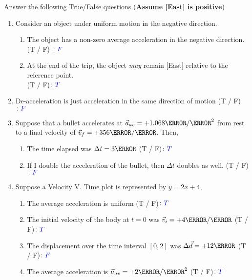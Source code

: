 \documentclass[12pt]{article} %
\begin{document}
\begin{qstn}[1] %
    Answer the following True/False questions (\textbf{Assume [East] is positive})
    \begin{enumerate}
        \item Consider an object under uniform motion in the negative direction.
            \begin{enumerate}[label = (\alph*)]
                \item The object has a non-zero average acceleration in the negative direction. (T / F) $\colon \textcolor{blue}{F}$
                \item At the end of the trip, the object \emph{may} remain [East] relative to the reference point. \\(T / F)$\colon \textcolor{blue}{T}$
            \end{enumerate}
        \item De-acceleration is just acceleration in the same direction of motion (T / F) $\colon \textcolor{blue}{F}$
        \item Suppose that a bullet accelerates at $\vec a_{av} = +1.068 \km / \s^2$ from rest to a final velocity of $\vec v_f = +356 \m / \s$. Then,
            \begin{enumerate}[label = (\alph*)]
                \item The time elapsed was $\Delta t = 3\s$ (T / F)$\colon \textcolor{blue}{T}$
                \item If I double the acceleration of the bullet, then $\Delta t$ doubles as well. (T / F)$\colon \textcolor{blue}{F}$
            \end{enumerate}
        \item Suppose a Velocity V. Time plot is represented by $y = 2x + 4$,
            \begin{enumerate}[label = (\alph*)]
                \item The average acceleration is uniform (T / F)$\colon \textcolor{blue}{T}$
                \item The initial velocity of the body at $t = 0$ was $\vec v_i = +4 \m / \s$ (T / F)$\colon \textcolor{blue}{T}$
                \item The displacement over the time interval $[0,2]$ was $\Delta \vec d = +12\m$ (T / F)$\colon \textcolor{blue}{F}$
                \item The average acceleration is $\vec a_{av} = +2\m / \s^2$ (T / F)$\colon \textcolor{blue}{T}$
            \end{enumerate}

\end{enumerate}
\end{qstn}
\end{document}
